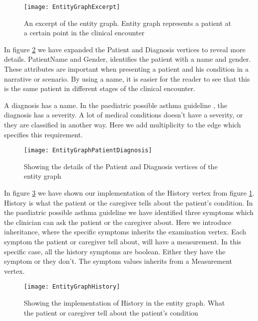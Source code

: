 \begin{figure}[h!]
	\label{fig:EntityGraphExcerpt}
	\texttt{[image: EntityGraphExcerpt]}
	\caption {An excerpt of the entity graph. Entity graph represents a patient at a certain point in the clinical encounter}
\end{figure}

In figure \ref{fig:EntityGraphPatientDiagnosis} we have expanded the Patient and Diagnosis vertices to reveal more details. PatientName and Gender, identifies the patient with a name and gender. These attributes are important when presenting a patient and his condition in a narrative or scenario. By using a name, it is easier for the reader to see that this is the same patient in different stages of the clinical encounter.

A diagnosis has a name. In the paediatric possible asthma guideline \parencite{RepublicofKeny2016}, the diagnosis has a severity. A lot of medical conditions doesn't have a severity, or they are classified in another way. Here we add multiplicity to the edge which specifies this requirement. 

\begin{figure}[h!]
	\label{fig:EntityGraphPatientDiagnosis}
	\texttt{[image: EntityGraphPatientDiagnosis]}
	\caption {Showing the details of the Patient and Diagnosis vertices of the entity graph}
\end{figure}

In figure \ref{fig:EntityGraphHistory} we have shown our implementation of the History vertex from figure \ref{fig:EntityGraphExcerpt}. History is what the patient or the caregiver tells about the patient's condition. In the paediatric possible asthma guideline \parencite{RepublicofKeny2016} we have identified three symptoms which the clinician can ask the patient or the caregiver about. Here we introduce inheritance, where the specific symptoms inherits the examination vertex. Each symptom the patient or caregiver tell about, will have a measurement. In this specific case, all the history symptoms are boolean. Either they have the symptom or they don't. The symptom values inherits from a Measurement vertex.

\begin{figure}[h!]
	\label{fig:EntityGraphHistory}
	\texttt{[image: EntityGraphHistory]}
	\caption {Showing the implementation of History in the entity graph. What the patient or caregiver tell about the patient's condition}
\end{figure}

